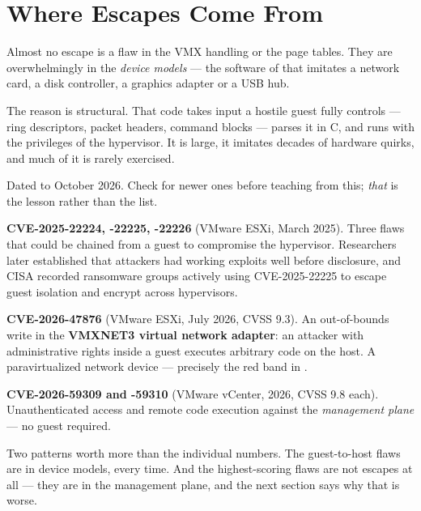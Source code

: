 \section{Where Escapes Come From}

Almost no escape is a flaw in the VMX handling or the page tables. They are
overwhelmingly in the \emph{device models} --- the software of
 that imitates a network card, a disk controller, a graphics
adapter or a USB hub.

The reason is structural. That code takes input a hostile guest fully
controls --- ring descriptors, packet headers, command blocks --- parses it in
C, and runs with the privileges of the hypervisor. It is large, it imitates
decades of hardware quirks, and much of it is rarely exercised.

\begin{conceptbox}
Dated to October 2026. Check for newer ones before teaching from this;
\emph{that} is the lesson rather than the list.

\begin{tight}
  \item \textbf{CVE-2025-22224, -22225, -22226} (VMware ESXi, March 2025).
        Three flaws that could be chained from a guest to compromise the
        hypervisor. Researchers later established that attackers had working
        exploits well before disclosure, and CISA recorded ransomware groups
        actively using CVE-2025-22225 to escape guest isolation and encrypt
        across hypervisors.
  \item \textbf{CVE-2026-47876} (VMware ESXi, July 2026, CVSS 9.3). An
        out-of-bounds write in the \textbf{VMXNET3 virtual network adapter}: an
        attacker with administrative rights inside a guest executes arbitrary
        code on the host. A paravirtualized network device --- precisely the
        red band in .
  \item \textbf{CVE-2026-59309 and -59310} (VMware vCenter, 2026, CVSS 9.8
        each). Unauthenticated access and remote code execution against the
        \emph{management plane} --- no guest required.
\end{tight}

\smallskip
Two patterns worth more than the individual numbers. The guest-to-host flaws
are in device models, every time. And the highest-scoring flaws are not escapes
at all --- they are in the management plane, and the next section says why
that is worse.
\end{conceptbox}

